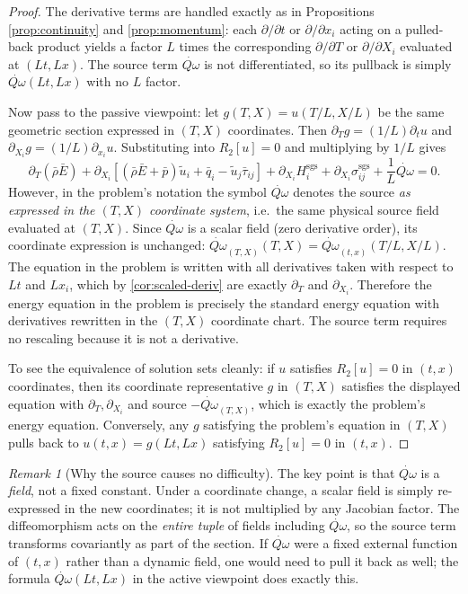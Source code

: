 \documentclass[11pt]{article}
\theoremstyle{definition}
\theoremstyle{remark}
\newtheorem{remark}[theorem]{Remark}
\newcommand{\sgs}{\mathrm{sgs}}
\newcommand{\barrho}{\bar{\rho}}
\newcommand{\barp}{\bar{p}}
\newcommand{\barE}{\bar{E}}
\newcommand{\bartau}{\bar{\tau}}
\newcommand{\barq}{\bar{q}}
\newcommand{\tilu}{\widetilde{u}}
\newcommand{\Qdot}{\dot{Q\omega}}
\begin{document}
\begin{proof}
The derivative terms are handled exactly as in
Propositions \ref{prop:continuity} and \ref{prop:momentum}: each $\partial/\partial t$ or
$\partial/\partial x_i$ acting on a pulled-back product yields a factor $L$
times the corresponding $\partial/\partial T$ or $\partial/\partial X_i$
evaluated at $(Lt,Lx)$.  The source term $\Qdot$ is not differentiated, so
its pullback is simply $\Qdot(Lt,Lx)$ with no $L$ factor.

Now pass to the passive viewpoint: let $g(T,X)=u(T/L,X/L)$ be the same
geometric section expressed in $(T,X)$ coordinates.  Then
$\partial_T g=(1/L)\partial_t u$ and $\partial_{X_i}g=(1/L)\partial_{x_i}u$.
Substituting into $R_2[u]=0$ and multiplying by $1/L$ gives
\[
\partial_T(\barrho\barE)
+\partial_{X_i}[(\barrho\barE+\barp)\tilu_i+\barq_i-\tilu_j\bartau_{ij}]
+\partial_{X_i}H^{\sgs}_i+\partial_{X_i}\sigma^{\sgs}_{ij}
+\frac{1}{L}\Qdot=0.
\]
However, in the problem's notation the symbol $\Qdot$ denotes the source
\emph{as expressed in the $(T,X)$ coordinate system}, i.e.\ the same physical
source field evaluated at $(T,X)$.  Since $\Qdot$ is a scalar field (zero
derivative order), its coordinate expression is unchanged:
$\Qdot_{(T,X)}(T,X)=\Qdot_{(t,x)}(T/L,X/L)$.  The equation in the problem is
written with all derivatives taken with respect to $Lt$ and $Lx_i$, which by
\ref{cor:scaled-deriv} are exactly $\partial_T$ and $\partial_{X_i}$.
Therefore the energy equation in the problem is precisely the standard energy
equation with derivatives rewritten in the $(T,X)$ coordinate chart.  The
source term requires no rescaling because it is not a derivative.

To see the equivalence of solution sets cleanly: if $u$ satisfies
$R_2[u]=0$ in $(t,x)$ coordinates, then its coordinate representative $g$ in
$(T,X)$ satisfies the displayed equation with $\partial_T,\partial_{X_i}$ and
source $-\Qdot_{(T,X)}$, which is exactly the problem's energy equation.
Conversely, any $g$ satisfying the problem's equation in $(T,X)$ pulls back
to $u(t,x)=g(Lt,Lx)$ satisfying $R_2[u]=0$ in $(t,x)$.
\end{proof}

\begin{remark}[Why the source causes no difficulty]
The key point is that $\Qdot$ is a \emph{field}, not a fixed constant.  Under
a coordinate change, a scalar field is simply re-expressed in the new
coordinates; it is not multiplied by any Jacobian factor.  The diffeomorphism
acts on the \emph{entire tuple} of fields including $\Qdot$, so the source
term transforms covariantly as part of the section.  If $\Qdot$ were a fixed
external function of $(t,x)$ rather than a dynamic field, one would need to
pull it back as well; the formula $\Qdot(Lt,Lx)$ in the active viewpoint
does exactly this.
\end{remark}
\end{document}
